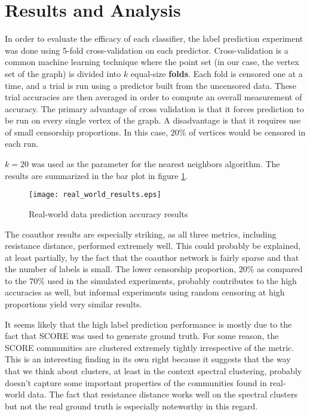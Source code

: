 \section{Results and Analysis}

In order to evaluate the efficacy of each classifier, the label prediction experiment was done using
5-fold cross-validation on each predictor. Cross-validation is a common machine learning technique
where the point set (in our case, the vertex set of the graph) is divided into $k$ equal-size
\textbf{folds}. Each fold is censored one at a time, and a trial is run using a predictor built from
the uncensored data. These trial accuracies are then averaged in order to compute an overall
measurement of accuracy. The primary advantage of cross validation is that it forces prediction to
be run on every single vertex of the graph. A disadvantage is that it requires use of small
censorship proportions. In this case, $20\%$ of vertices would be censored in each run.

$k=20$ was used as the parameter for the nearest neighbors algorithm. The results are summarized in
the bar plot in figure \ref{fig:real_world_results}.

\begin{figure}[H]
  \centering
  \texttt{[image: real\_world\_results.eps]}
  \caption{Real-world data prediction accuracy results}
  \label{fig:real_world_results}
\end{figure}

The coauthor results are especially striking, as all three metrics, including resistance distance,
performed extremely well. This could probably be explained, at least partially, by the fact that the
coauthor network is fairly sparse and that the number of labels is small. The lower censorship
proportion, $20\%$ as compared to the $70\%$ used in the simulated experiments, probably contributes
to the high accuracies as well, but informal experiments using random censoring at high proportions
yield very similar results.

It seems likely that the high label prediction performance is mostly due to the fact that SCORE was
used to generate ground truth. For some reason, the SCORE communities are clustered extremely
tightly irrespective of the metric. This is an interesting finding in its own right because it
suggests that the way that we think about clusters, at least in the context spectral clustering,
probably doesn't capture some important properties of the communities found in real-world data. The
fact that resistance distance works well on the spectral clusters but not the real ground truth is
especially noteworthy in this regard.

